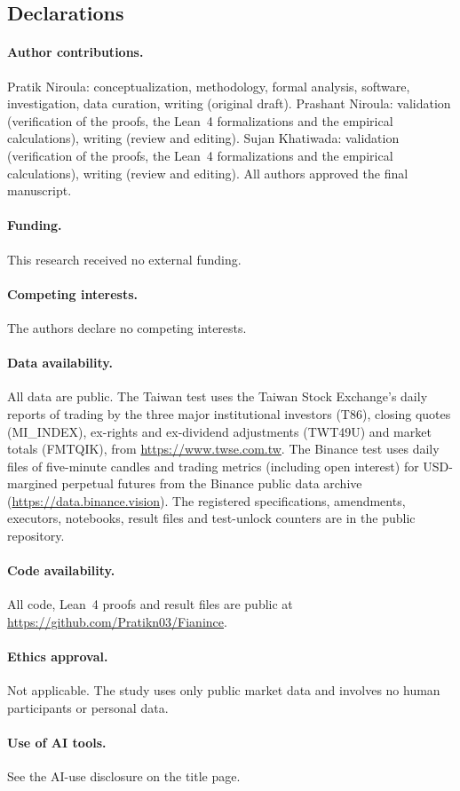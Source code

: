\subsection*{Declarations}

\paragraph{Author contributions.} Pratik Niroula: conceptualization, methodology, formal analysis, software, investigation, data curation, writing (original draft). Prashant Niroula: validation (verification of the proofs, the Lean~4 formalizations and the empirical calculations), writing (review and editing). Sujan Khatiwada: validation (verification of the proofs, the Lean~4 formalizations and the empirical calculations), writing (review and editing). All authors approved the final manuscript.

\paragraph{Funding.} This research received no external funding.

\paragraph{Competing interests.} The authors declare no competing interests.

\paragraph{Data availability.} All data are public. The Taiwan test uses the Taiwan Stock Exchange's daily reports of trading by the three major institutional investors (T86), closing quotes (MI\_INDEX), ex-rights and ex-dividend adjustments (TWT49U) and market totals (FMTQIK), from \url{https://www.twse.com.tw}. The Binance test uses daily files of five-minute candles and trading metrics (including open interest) for USD-margined perpetual futures from the Binance public data archive (\url{https://data.binance.vision}). The registered specifications, amendments, executors, notebooks, result files and test-unlock counters are in the public repository.

\paragraph{Code availability.} All code, Lean~4 proofs and result files are public at \url{https://github.com/Pratikn03/Fianince}.

\paragraph{Ethics approval.} Not applicable. The study uses only public market data and involves no human participants or personal data.

\paragraph{Use of AI tools.} See the AI-use disclosure on the title page.

